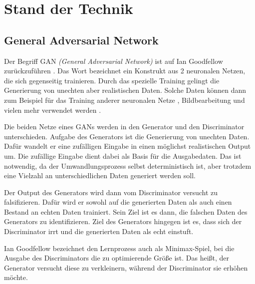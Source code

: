 
\chapter{Stand der Technik}

\section{General Adversarial Network}


Der Begriff GAN \textit{(General Adversarial Network)} ist auf Ian Goodfellow zurückzuführen \cite{gan-original-paper}.
Das Wort bezeichnet ein Konstrukt aus 2 neuronalen Netzen, die sich gegenseitig trainieren.
Durch das spezielle Training gelingt die Generierung von unechten aber realistischen Daten.
Solche Daten können dann zum Beispiel für das Training anderer neuronalen Netze \cite{gan-application-augmenting-training-data}, Bildbearbeitung \cite{gan-application-upscaling, gan-application-blending} und vielen mehr verwendet werden \cite{gan-application-dna-optimizes-protein-functions, gan-application-audio-synthesis}.
\newline

Die beiden Netze eines GANs werden in den Generator und den Discriminator unterschieden.
Aufgabe des Generators ist die Generierung von unechten Daten.
Dafür wandelt er eine zufälligen Eingabe in einen möglichst realistischen Output um.
Die zufällige Eingabe dient dabei als Basis für die Ausgabedaten.
Das ist notwendig, da der Umwandlungsprozess selbst deterministisch ist, aber trotzdem eine Vielzahl an unterschiedlichen Daten generiert werden soll.

Der Output des Generators wird dann vom Discriminator versucht zu falsifizieren.
Dafür wird er sowohl auf die generierten Daten als auch einen Bestand an echten Daten trainiert.
Sein Ziel ist es dann, die falschen Daten des Generators zu identifizieren.
Ziel des Generators hingegen ist es, dass sich der Discriminator irrt und die generierten Daten als echt einstuft.

Ian Goodfellow bezeichnet den Lernprozess auch als Minimax-Spiel, bei die Ausgabe des Discriminators die zu optimierende Größe ist.
Das heißt, der Generator versucht diese zu verkleinern, während der Discriminator sie erhöhen möchte. \cite{gan-minimax} 
\newline

